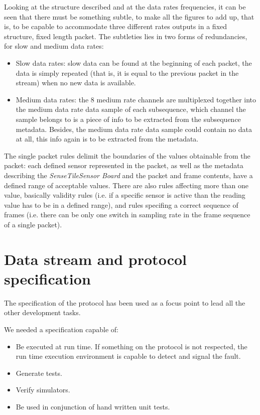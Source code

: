 \documentclass{article}
\newcommand{\ST}{\emph{SenseTile}\xspace}
\newcommand{\STSB}{\ST \emph{Sensor Board}\xspace}
\begin{document}
Looking at the structure described and at the data rates frequencies, it
can be seen that there must be something subtle, to make all the figures to 
add up, that is, to be capable to accommodate three different rates outputs
in a fixed structure, fixed length packet.
The subtleties lies in two forms of redundancies, for slow and medium data 
rates:

\begin{itemize}
  \item Slow data rates: slow data can be found at the beginning of each 
  packet, the data is simply repeated (that is, it is equal to the previous 
  packet in the stream) when no new data is available.
  \item Medium data rates: the 8 medium rate channels are multiplexed together 
  into the medium data rate data sample of each subsequence, which channel the 
  sample belongs to is a piece of info to be extracted from the subsequence 
  metadata. Besides, the medium data rate data sample could contain no data at 
  all, this info again is to be extracted from the metadata.
\end{itemize}

The single packet rules delimit the boundaries of the values obtainable from 
the packet: each defined sensor represented in the packet, as well as the 
metadata describing the \STSB and the packet and frame contents,  have a defined 
range of acceptable values.
There are also rules affecting more than one value, basically validity rules (i.e. if 
a specific sensor is active than the reading value has to be in a defined range), 
and rules specifing a correct sequence of frames (i.e. there can be only one switch 
in sampling rate in the frame sequence of a single packet).



\section{Data stream and protocol specification}
\label{sec:data_stream_and_protocol_specification}

The specification of the protocol has been used as a focus point to lead all the 
other development tasks.

We needed a specification capable of:

\begin{itemize}
 \item Be executed at run time. If something on the protocol is not respected, 
the run time execution environment is capable to detect and signal the fault.
 \item Generate tests. 
 \item Verify simulators.
 \item Be used in conjunction of hand written unit tests.
\end{itemize}
\end{document}
